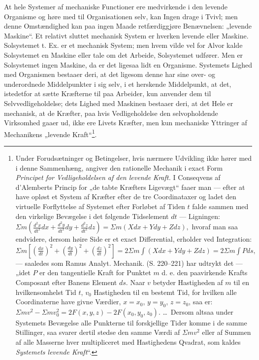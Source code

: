 \documentclass[12pt,a4paper]{book}
\begin{document}
\setcounter{footnote}{0}
At hele Systemer af mechaniske Functioner ere medvirkende i den levende
Organisme og høre med til Organisationen selv, kan Ingen drage i Tvivl;
men denne Omstændighed kan paa ingen Maade retfærdiggjøre Benævnelsen:
„levende Maskine“. Et relativt sluttet mechanisk System er hverken
levende eller Maskine. Solsystemet t. Ex. er et mechanisk System; men
hvem vilde vel for Alvor kalde Solsystemet en Maskine eller tale om det
Arbeide, Solsystemet udfører. Men er Solsystemet ingen Maskine, da er det
ligesaa lidt en Organisme. Systemets Lighed med Organismen bestaaer deri,
at det ligesom denne har sine over- og underordnede Middelpunkter i sig
selv, i et herskende Middelpunkt, at det, istedetfor at sætte Kræfterne
til paa Arbeider, kun anvender dem til Selvvedligeholdelse; dets Lighed
med Maskinen bestaaer deri, at det Hele er mechanisk, at de Kræfter, paa
hvis Vedligeholdelse den selvopholdende Virksomhed gaaer ud, ikke ere
Livets Kræfter, men kun mechaniske Yttringer af Mechanikens „levende
Kraft“\footnote{Under Forudsætninger og Betingelser, hvis nærmere
Udvikling ikke hører med i denne Sammenhæng, angiver den rationelle
Mechanik i exact Form \emph{Principet for Vedligeholdelsen af den levende
Kraft.} I Conseqvens af d'Alemberts Princip for „de tabte Kræfters
Ligevægt“ faaer man --- efter at have opløst et System af Kræfter efter
de tre Coordinataxer og ladet den virtuelle Forflyttelse af Systemet
efter Forløbet af Tiden $t$ falde sammen med den virkelige Bevægelse i
det følgende Tidselement $dt$ --- Ligningen:
$\Sigma m\left(\frac{d^2x}{dt^2}dx + \frac{d^2y}{dt^2}dy +
\frac{d^2z}{dt^2}dz\right) = \Sigma m(Xdx + Ydy + Zdz),$
hvoraf man saa endvidere, dersom høire Side er et exact Differential,
erholder ved Integration:
$\Sigma m\left[\left(\frac{dx}{dt}\right)^2 +
\left(\frac{dy}{dt}\right)^2 + \left(\frac{dz}{dt}\right)^2\right] =
2\Sigma m\int(Xdx + Ydy + Zdz) = 2\Sigma m\int Pds,$
--- saaledes som Ramus Analyt. Mechanik. (S. 220--221) har udtrykt det
--- „idet $P$ er den tangentielle Kraft for Punktet $m$ d. e. den
paavirkende Krafts Composant efter Banens Element $ds$. Naar $v$ betyder
Hastigheden af $m$ til en hvilkensomhelst Tid $t$, $v_0$ Hastigheden til
en bestemt Tid, for hvilken alle Coordinaterne have givne Værdier, $x =
x_0$, $y = y_0$, $z = z_0$, saa er:
$\Sigma mv^2 - \Sigma mv_0^2 = 2F(x, y, z) - 2F(x_0, y_0, z_0).$
\ldots\ Dersom altsaa under Systemets Bevægelse alle Punkterne til
forskjellige Tider komme i de samme Stillinger, saa svarer dertil stedse
den samme Værdi af $\Sigma mv^2$ eller af Summen af alle Masserne hver
multipliceret med Hastighedens Qvadrat, som kaldes \emph{Systemets
levende Kraft}“.}.
\end{document}

